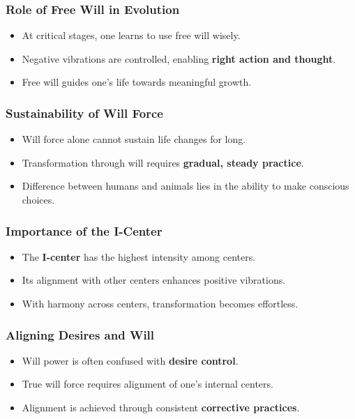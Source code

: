 \begin{frame}[fragile]\frametitle{Role of Free Will in Evolution}
    \begin{itemize}
        \item At critical stages, one learns to use free will wisely.
        \item Negative vibrations are controlled, enabling \textbf{right action and thought}.
        \item Free will guides one's life towards meaningful growth.
    \end{itemize}
\end{frame}

\begin{frame}[fragile]\frametitle{Sustainability of Will Force}
    \begin{itemize}
        \item Will force alone cannot sustain life changes for long.
        \item Transformation through will requires \textbf{gradual, steady practice}.
        \item Difference between humans and animals lies in the ability to make conscious choices.
    \end{itemize}
\end{frame}

\begin{frame}[fragile]\frametitle{Importance of the I-Center}
    \begin{itemize}
        \item The \textbf{I-center} has the highest intensity among centers.
        \item Its alignment with other centers enhances positive vibrations.
        \item With harmony across centers, transformation becomes effortless.
    \end{itemize}
\end{frame}

\begin{frame}[fragile]\frametitle{Aligning Desires and Will}
    \begin{itemize}
        \item Will power is often confused with \textbf{desire control}.
        \item True will force requires alignment of one’s internal centers.
        \item Alignment is achieved through consistent \textbf{corrective practices}.
    \end{itemize}
\end{frame}

